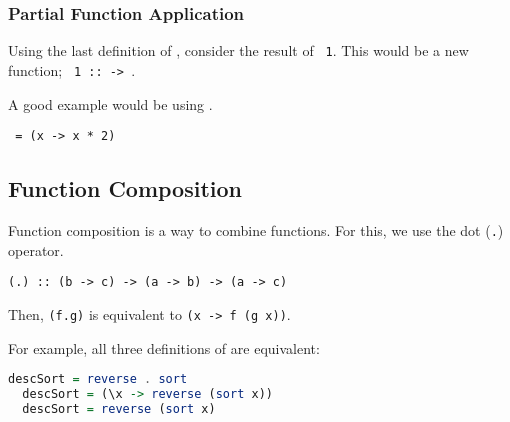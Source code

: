 \subsubsection{Partial Function Application}
Using the last definition of \texttt{}, consider the result of \texttt{ 1}. This would be a new function; \texttt{ 1 ::  -> }.

A good example would be using \texttt{}.
\begin{center}
  \texttt{ =  (x -> x * 2)}
\end{center}

\subsection{Function Composition}
Function composition is a way to combine functions. For this, we use the dot (\texttt{.}) operator.
\begin{center}
  \texttt{(.) :: (b -> c) -> (a -> b) -> (a -> c)}
\end{center}
Then, \texttt{(f.g)} is equivalent to \texttt{(x -> f (g x))}.

For example, all three definitions of \texttt{} are equivalent:
\begin{lstlisting}[language=haskell]
  descSort = reverse . sort
  descSort = (\x -> reverse (sort x))
  descSort = reverse (sort x)
\end{lstlisting}